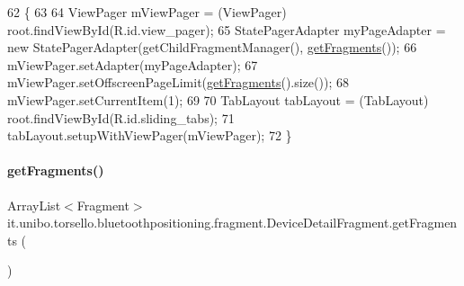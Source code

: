 \begin{DoxyCode}
62                                              \{
63 
64         ViewPager mViewPager = (ViewPager) root.findViewById(R.id.view\_pager);
65         StatePagerAdapter myPageAdapter = \textcolor{keyword}{new} StatePagerAdapter(getChildFragmentManager(), 
      \hyperlink{classit_1_1unibo_1_1torsello_1_1bluetoothpositioning_1_1fragment_1_1DeviceDetailFragment_a98e370cfcbfe5eaa4e1fe9242b00e639_a98e370cfcbfe5eaa4e1fe9242b00e639}{getFragments}());
66         mViewPager.setAdapter(myPageAdapter);
67         mViewPager.setOffscreenPageLimit(\hyperlink{classit_1_1unibo_1_1torsello_1_1bluetoothpositioning_1_1fragment_1_1DeviceDetailFragment_a98e370cfcbfe5eaa4e1fe9242b00e639_a98e370cfcbfe5eaa4e1fe9242b00e639}{getFragments}().size());
68         mViewPager.setCurrentItem(1);
69 
70         TabLayout tabLayout = (TabLayout) root.findViewById(R.id.sliding\_tabs);
71         tabLayout.setupWithViewPager(mViewPager);
72     \}
\end{DoxyCode}
\hypertarget{classit_1_1unibo_1_1torsello_1_1bluetoothpositioning_1_1fragment_1_1DeviceDetailFragment_a98e370cfcbfe5eaa4e1fe9242b00e639_a98e370cfcbfe5eaa4e1fe9242b00e639}{}\label{classit_1_1unibo_1_1torsello_1_1bluetoothpositioning_1_1fragment_1_1DeviceDetailFragment_a98e370cfcbfe5eaa4e1fe9242b00e639_a98e370cfcbfe5eaa4e1fe9242b00e639} 
\paragraph{\texorpdfstring{get\+Fragments()}{getFragments()}}
{\footnotesize\ttfamily Array\+List$<$Fragment$>$ it.\+unibo.\+torsello.\+bluetoothpositioning.\+fragment.\+Device\+Detail\+Fragment.\+get\+Fragments (\begin{DoxyParamCaption}{ }\end{DoxyParamCaption})\hspace{0.3cm}{\ttfamily [private]}}



